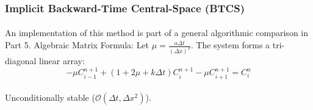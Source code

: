 \subsubsection*{Implicit Backward-Time Central-Space (BTCS)}
\paragraph{}
An implementation of this method is part of a general algorithmic comparison in Part 5. Algebraic Matrix Formula: Let $\mu = \frac{a \Delta t}{(\Delta x)^2}$. The system forms a tri-diagonal linear array:
\begin{equation*}
-\mu C_{i-1}^{n+1} + \left(1 + 2\mu + k\Delta t\right) C_i^{n+1} - \mu C_{i+1}^{n+1} = C_i^n
\end{equation*}
\paragraph{}
Unconditionally stable ($\mathcal{O}(\Delta t, \Delta x^2)$).
